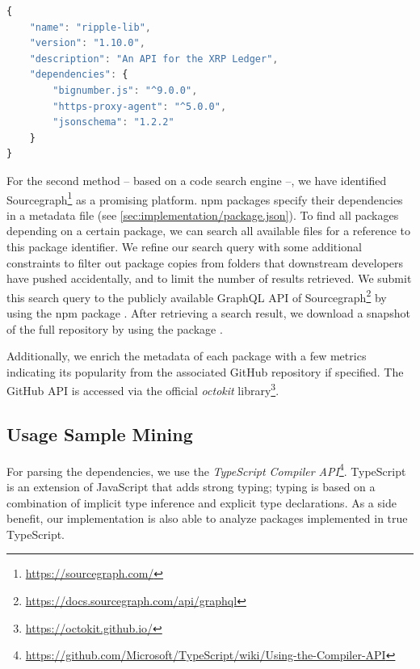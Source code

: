 \documentclass[a4paper,twoside]{article}
\begin{document}
\begin{lstfloat}[t]
\begin{lstlisting}[language=typescript,%json,
	label=sec:implementation/package.json,
	caption={Example \texttt{package.json} file for the \texttt{ripple-lib} package specifying multiple dependencies (truncated). The list of dependencies that are extracted from this example contains \texttt{bignumber.js}, \texttt{https-proxy-agent}, and \texttt{jsonschema}.}]
{
	"name": "ripple-lib",
	"version": "1.10.0",
	"description": "An API for the XRP Ledger",
	"dependencies": {
		"bignumber.js": "^9.0.0",
		"https-proxy-agent": "^5.0.0",
		"jsonschema": "1.2.2"
	}
}
\end{lstlisting}
\end{lstfloat}

For the second method -- based on a code search engine --, we have identified Sourcegraph\footnote{\url{https://sourcegraph.com/}} as a promising platform.
npm packages specify their dependencies in a  metadata file (see \cref{sec:implementation/package.json}).
To find all packages depending on a certain package, we can search all available  files for a reference to this package identifier.
We refine our search query with some additional constraints to filter out package copies from  folders that downstream developers have pushed accidentally, and to limit the number of results retrieved.
We submit this search query to the publicly available GraphQL API of Sourcegraph\footnote{\url{https://docs.sourcegraph.com/api/graphql}} by using the npm package .
After retrieving a search result, we download a snapshot of the full repository by using the package .

Additionally, we enrich the metadata of each package with a few metrics indicating its popularity from the associated GitHub repository if specified.
The GitHub API is accessed via the official \emph{octokit} library\footnote{\url{https://octokit.github.io/}}.

\subsection{Usage Sample Mining}
\label{sec:implementation/usage_mining}

For parsing the dependencies, we use the \emph{TypeScript Compiler API}\footnote{\url{https://github.com/Microsoft/TypeScript/wiki/Using-the-Compiler-API}}.
TypeScript is an extension of JavaScript that adds strong typing; typing is based on a combination of implicit type inference and explicit type declarations.
As a side benefit, our implementation is also able to analyze packages implemented in true TypeScript.
\end{document}
